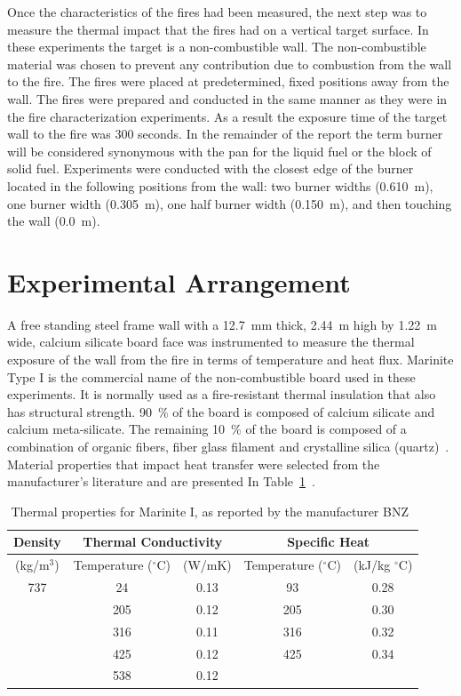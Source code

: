 \documentclass[twoside]{uocthesis}
\begin{document}
{Once the characteristics of the fires had been measured, the next step was to measure the thermal impact that the fires had on a vertical target surface.  In these experiments the target is a non-combustible wall. The non-combustible material was chosen to prevent any contribution due to combustion from the wall to the fire.  The fires were placed at predetermined, fixed positions away from the wall. The fires were prepared and conducted in the same manner as they were in the fire characterization experiments. As a result the exposure time of the target wall to the fire was 300 seconds. In the remainder of the report the term burner will be considered synonymous with the pan for the liquid fuel or the block of solid fuel. Experiments were conducted with the closest edge of the burner located in the following positions from the wall: two burner widths (0.610~m), one burner width (0.305~m), one half burner width (0.150~m), and then touching the wall (0.0~m).


\section{Experimental Arrangement}

A free standing steel frame wall with a 12.7~mm thick, 2.44~m high by 1.22~m wide, calcium silicate board face was instrumented to measure the thermal exposure of the wall from the fire in terms of temperature and heat flux. Marinite Type I is the commercial name of the non-combustible board used in these experiments.  It is normally used as a fire-resistant thermal insulation that also has structural strength. 90~\% of the board is composed of calcium silicate and calcium meta-silicate.  The remaining 10~\% of the board is composed of a combination of organic fibers, fiber glass filament and crystalline silica (quartz)~\cite{BNZ:MSDS}.  Material properties that impact heat transfer were selected from the manufacturer's literature and are presented In Table~\ref{tab:Marinite_Thermal_Properties}~\cite{Marinite:1997}.

\begin{table}[h]
	\centering
\begin{tabular}{|c|c|c|c|c|}
	\hline Density & \multicolumn{2}{c|}{Thermal Conductivity} & \multicolumn{2}{c|}{Specific Heat}   \\
	\hline (kg/m$^3$) & Temperature ($^\circ$C) & (W/mK)  & Temperature ($^\circ$C)  & (kJ/kg $^\circ$C) \\ \hline
	\hline 737  & 24 & 0.13 & 93 & 0.28 \\
	\hline  & 205 & 0.12  & 205 & 0.30 \\
	\hline  & 316 & 0.11 & 316 & 0.32 \\
	\hline  & 425 & 0.12 & 425 & 0.34 \\
	\hline  & 538 & 0.12 &  &  \\
	\hline
\end{tabular}
\caption[Thermal properties for Marinite I]{Thermal properties for Marinite I, as reported by the manufacturer BNZ~\cite{Marinite:1997}}
\label{tab:Marinite_Thermal_Properties}
\end{table}

}
\end{document}
